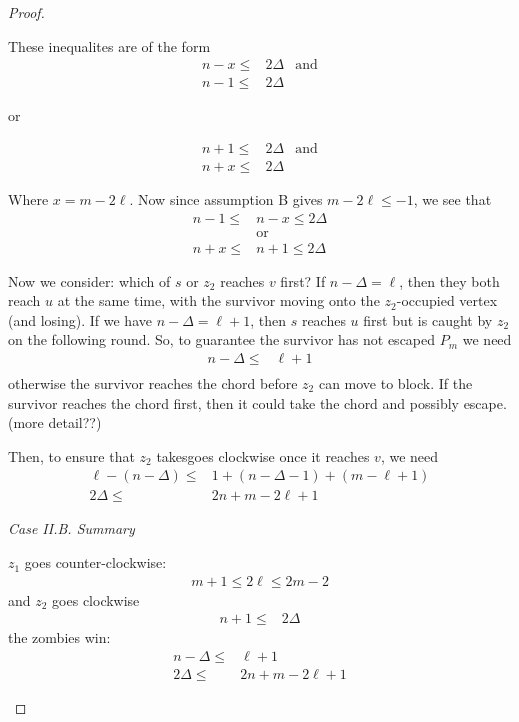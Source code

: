 \begin{proof}
\begin{proofpart}
  These inequalites are of the form
  \begin{align*}
   n-x \leq & 2 \Delta & \text{and} \\
   n-1 \leq & 2\Delta
  \end{align*}
  \begin{center}or\end{center}
  \begin{align*}
   n + 1 \leq & 2 \Delta & \text{and} \\
   n + x \leq & 2 \Delta
  \end{align*}

  Where $x = m -2\ell$. Now since assumption B gives $m - 2\ell \leq -1$, we
  see that
  \begin{align*}
   n-1 \leq & n-x \leq 2 \Delta \\
            & \text{or}         \\
   n+x \leq & n+1 \leq 2 \Delta
  \end{align*}

  Now we consider: which of $s$ or $z_2$ reaches $v$ first?
  If $n - \Delta = \ell$, then they both reach $u$ at the same time,
  with the survivor moving onto the $z_2$-occupied vertex (and losing).
  If we have $n - \Delta = \ell + 1$, then $s$ reaches $u$ first
  but is caught by $z_2$ on the following round.
  So, to guarantee the survivor has not escaped $P_m$ we need
  \begin{align*}
   n - \Delta \leq & \ell + 1 \\
  \end{align*}
  otherwise the survivor reaches the chord before $z_2$ can move
  to block. If the survivor reaches the chord first, then it could
  take the chord and possibly escape. (more detail??)

  Then, to ensure that $z_2$ takesgoes clockwise once
  it reaches $v$, we need
  \begin{align*}
   \ell - (n - \Delta) \leq & 1 + (n - \Delta - 1) + (m - \ell + 1) \\
   2 \Delta \leq            & 2n + m - 2\ell + 1
  \end{align*}

  \textit{Case II.B. Summary}

  $z_1$ goes counter-clockwise:
  \begin{align*}
   m + 1 \leq 2 \ell \leq 2m - 2
  \end{align*}
  and $z_2$ goes clockwise
  \begin{align*}
   n+1 \leq & 2 \Delta
  \end{align*}
  the zombies win:
  \begin{align*}
   n - \Delta \leq & \ell + 1           \\
   2 \Delta \leq   & 2n + m - 2\ell + 1
  \end{align*}



\end{proofpart}
\end{proof}
